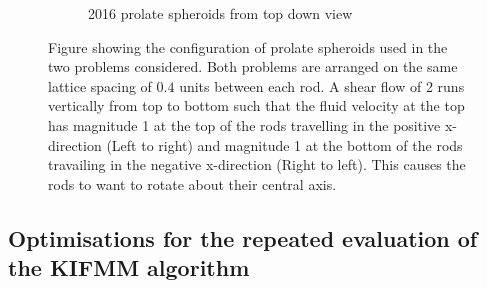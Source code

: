 \begin{figure}[!ht]
\begin{subfigure}[b]{0.475\textwidth}
            \caption[]%
            {{\small 2016 prolate spheroids from top down view}}    
            \label{fig:mean and std of net44}
        \end{subfigure}
        \caption[Images of Rods in Shear flow]
        {\small Figure showing the configuration of prolate spheroids used in the two problems considered. Both problems are arranged on the same lattice spacing of $0.4$ units between each rod. A shear flow of 2 runs vertically from top to bottom such that the fluid velocity at the top has magnitude 1 at the top of the rods travelling in the positive x-direction (Left to right) and magnitude 1 at the bottom of the rods travailing in the negative x-direction (Right to left). This causes the rods to want to rotate about their central axis. } 
        \label{fig:mean and std of nets}
    \end{figure}


\subsection[Optimisations for the repeated evaluation of the KIFMM algorithm]{Optimisations for the repeated evaluation of the KIFMM algorithm%
}


